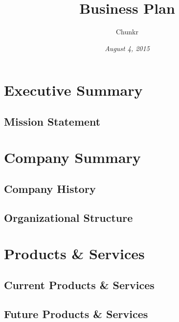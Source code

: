 \documentclass[titlepage]{article}
\begin{document}
\title{\Huge \textbf{Business Plan}}
\date{\emph{August 4, 2015}}
\author{\Large Chunkr}
\maketitle

\tableofcontents

\section{Executive Summary}

\subsection{Mission Statement}

\section{Company Summary}
\subsection{Company History}
\subsection{Organizational Structure}

\section{Products \& Services}
\subsection{Current Products \& Services}
\subsection{Future Products \& Services}
\end{document}
